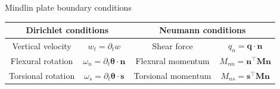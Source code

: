 \documentclass[aspectratio=169]{ISAE-Beamer}
\begin{document}
\begin{frame}{Mindlin plate boundary conditions}
\begin{overlayarea}{\textwidth}{\textheight}
\begin{table}
	\centering
	\begin{tabular}{cc|cc}
		\hline 
		\multicolumn{2}{c}{Dirichlet conditions}&  \multicolumn{2}{c}{Neumann conditions} \\ 
		\hline 
		Vertical velocity  & $w_t = \partial_t {w}$ & Shear force  & $q_n = \bm{q} \cdot \bm{n}$ \\ 
		Flexural rotation  & $\omega_n = \partial_t {\bm{\theta}} \cdot \bm{n}$ & Flexural momentum & $M_{nn} = \bm{n}^\top\bm{M}\bm{n}$ \\  
		Torsional rotation & $\omega_s = \partial_t {\bm{\theta}} \cdot \bm{s}$ & Torsional momentum  & $ M_{ns} = \bm{s}^\top\bm{M}\bm{n}$  \\ 
		\hline 
	\end{tabular}
\end{table}
\end{overlayarea}	

\end{frame}
\end{document}
